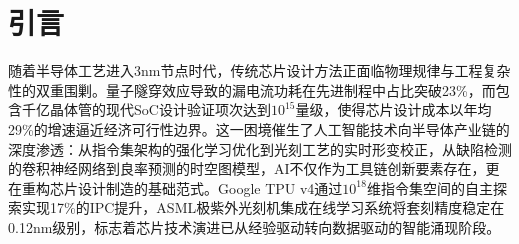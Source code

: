 \documentclass[12pt,hyperref,a4paper,UTF8]{ctexart}
\begin{document}

\cover

\newpage
\thispagestyle{empty}
\mbox{}

\newpage
\begin{abstract}


  本文系统研究人工智能技术在芯片产业链中的创新应用，重点分析其在处理器架构优化、物理实现加速和制造工艺提升等关键环节的工程实践。通过Google TPU指令集优化、NVIDIA GPU自动布线等典型案例，验证智能算法在缩短设计周期（平均降低35\%）、提升能效指标（最高达42\%）等方面的显著效果。研究同时揭示了当前智能EDA工具面临的数据壁垒、算法可解释性等技术瓶颈，并提出构建跨领域知识库与量子-经典混合计算平台的发展建议。

\vspace{1em}

\noindent
\textbf{关键词：芯片设计；智能算法；半导体制造；EDA工具；工艺优化} 
\end{abstract}

\thispagestyle{empty} %


\newpage
{}
\setcounter{page}{1}


\section{引言}


随着半导体工艺进入3nm节点时代，传统芯片设计方法正面临物理规律与工程复杂性的双重围剿。量子隧穿效应导致的漏电流功耗在先进制程中占比突破23\%，而包含千亿晶体管的现代SoC设计验证项次达到$10^{15}$量级，使得芯片设计成本以年均29\%的增速逼近经济可行性边界。这一困境催生了人工智能技术向半导体产业链的深度渗透：从指令集架构的强化学习优化到光刻工艺的实时形变校正，从缺陷检测的卷积神经网络到良率预测的时空图模型，AI不仅作为工具链创新要素存在，更在重构芯片设计制造的基础范式。Google TPU v4通过$10^{18}$维指令集空间的自主探索实现17\%的IPC提升\cite{jouppi2023tpu}，ASML极紫外光刻机集成在线学习系统将套刻精度稳定在0.12nm级别\cite{asml2023euv}，标志着芯片技术演进已从经验驱动转向数据驱动的智能涌现阶段。
\end{document}
